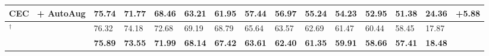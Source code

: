 \begin{table*}[t]
{\begin{tabular}{llllllllllllll}
			CEC~\cite{zhang2021few} + AutoAug                & 75.74   & 71.77    & 68.46   & 63.21   & 61.95    & 57.44 & 56.97 & 55.24    &54.23  &52.95  & 51.38   & 24.36&\bf +5.88   \\
			\midrule
			\mame$^\dagger$             &  76.32   &  74.18     & 72.68    & 69.19  & 68.79   &65.64  & 63.57   & 62.69     & 61.47   & 60.44   & 58.45& 17.87 \\
			\name             & \bf 75.89   & \bf 73.55     & \bf71.99    & \bf68.14  & \bf67.42   &\bf63.61  & \bf62.40   &\bf 61.35     & \bf59.91   & \bf58.66   & \bf57.41&\bf 18.48 \\
			
			
			\bottomrule
		\end{tabular}
	}\label{table:cub}
\end{table*}


